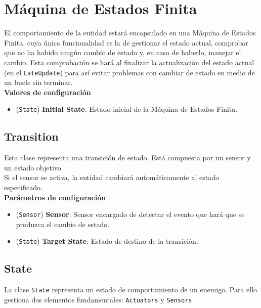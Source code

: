 \section {Máquina de Estados Finita}

El comportamiento de la entidad estará encapsulado en una Máquina de Estados Finita, cuya única funcionalidad es la de gestionar el estado actual, comprobar que no ha habido ningún cambio de estado y, en caso de haberlo, manejar el cambio. Esta comprobación se hará al finalizar la actualización del estado actual (en el \texttt{LateUpdate}) para así evitar problemas con cambiar de estado en medio de un bucle sin terminar.\\

\textbf{Valores de configuración}
\begin{itemize}
	\item (\texttt{State}) \textbf{Initial State}: Estado inicial de la Máquina de Estados Finita.
\end{itemize}

\subsection{Transition}
Esta clase representa una transición de estado. Está compuesta por un sensor y un estado objetivo.\\

Si el sensor se activa, la entidad cambiará automáticamente al estado especificado.\\

\textbf{Parámetros de configuración}
\begin{itemize}
	\item (\texttt{Sensor}) \textbf{Sensor}: Sensor encargado de detectar el evento que hará que se produzca el cambio de estado.
	\item (\texttt{State}) \textbf{Target State}: Estado de destino de la transición.
\end{itemize}

\subsection{State}

La clase \texttt{State} representa un estado de comportamiento de un enemigo. Para ello gestiona dos elementos fundamentales: \texttt{Actuators} y \texttt{Sensors}.\\


